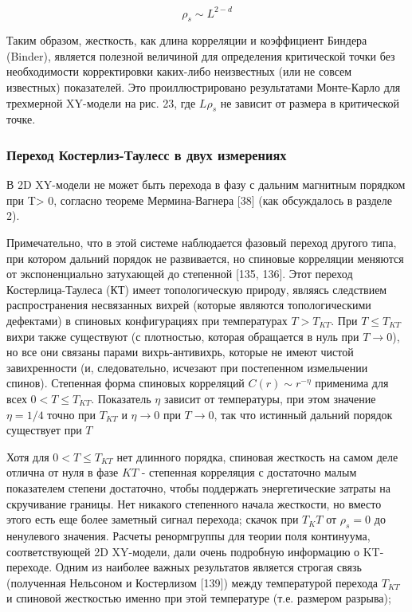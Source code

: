 \documentclass[11pt]{article}
\begin{document}
\begin{equation}
\rho_s \sim L^{2-d}
\label{eq_99}
\end{equation}

Таким образом, жесткость, как длина корреляции и коэффициент Биндера (Binder), является полезной величиной для определения критической точки без необходимости корректировки каких-либо неизвестных (или не совсем известных) показателей. Это проиллюстрировано результатами Монте-Карло для трехмерной XY-модели на рис. 23, где $L\rho_s$ не зависит от размера в критической точке.


\subsubsection{Переход Костерлиз-Таулесс в двух измерениях}
В 2D XY-модели не может быть перехода в фазу с дальним магнитным порядком при T> 0, согласно теореме Мермина-Вагнера [38] (как обсуждалось в разделе 2).

Примечательно, что в этой системе наблюдается фазовый переход другого типа, при котором дальний порядок не развивается, но спиновые корреляции меняются от экспоненциально затухающей до степенной [135, 136]. Этот переход Костерлица-Таулеса (КТ) имеет топологическую природу, являясь следствием распространения несвязанных вихрей (которые являются топологическими дефектами) в спиновых конфигурациях при температурах $T> T_{KT}$. При $T \le T_{KT}$ вихри также существуют (с плотностью, которая обращается в нуль при $T \to 0$), но все они связаны парами вихрь-антивихрь, которые не имеют чистой завихренности (и, следовательно, исчезают при постепенном измельчении спинов). Степенная форма спиновых корреляций $C(r) \sim r^{- \eta}$ применима для всех $0 < T \le T_{KT}$. 
Показатель $\eta$ зависит от температуры, при этом значение $\eta = 1/4$ точно при $T_{KT}$ и $\eta \to 0$ при $T \to 0$, так что истинный дальний порядок существует при $T$

Хотя для $0 <T \le T_{KT}$ нет длинного порядка, спиновая жесткость на самом деле отлична от нуля в фазе $KT$ - степенная корреляция с достаточно малым показателем степени достаточно, чтобы поддержать энергетические затраты на скручивание границы. Нет никакого степенного начала жесткости, но вместо этого есть еще более заметный сигнал перехода; скачок при $T_KT$ от $\rho_s = 0$ до ненулевого значения. Расчеты ренормгруппы для теории поля континуума, соответствующей 2D XY-модели, дали очень подробную информацию о KT-переходе. Одним из наиболее важных результатов является строгая связь (полученная Нельсоном и Костерлизом [139]) между температурой перехода $T_{KT}$ и спиновой жесткостью именно при этой температуре (т.е. размером разрыва);
\end{document}
